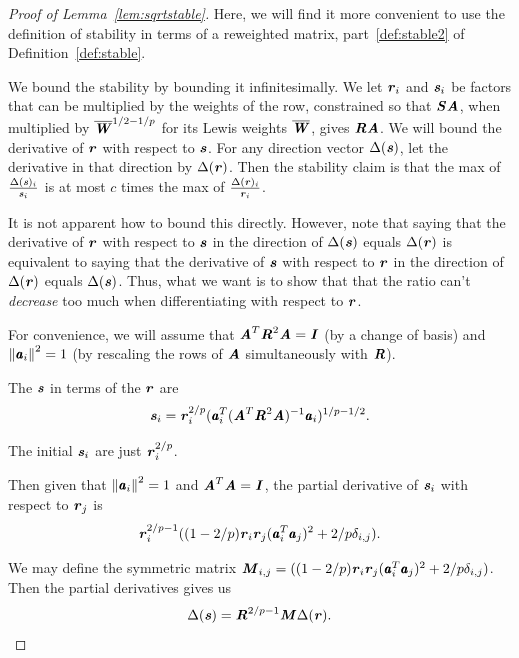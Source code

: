 \begin{proof}[Proof of Lemma~\ref{lem:sqrtstable}]
Here, we will find it more convenient to use the definition of stability in terms of a reweighted matrix,
part~\ref{def:stable2} of Definition~\ref{def:stable}.

We bound the stability by bounding it infinitesimally.  We let $\rr_i$ and $\ss_i$ be factors that can be
multiplied by the weights of the row, constrained so that $\SS \AA$, when multiplied by
$\WWbar^{1/2-1/p}$ for its Lewis weights $\WWbar$, gives $\RR \AA$.  We will bound the derivative
of $\rr$ with respect to $\ss$.  For any direction vector $\Delta(\ss)$, let the derivative
in that direction by $\Delta(\rr)$.  Then the stability claim is that the max of $\frac{\Delta(\ss)_i}{\ss_i}$
is at most $c$ times the max of $\frac{\Delta(\rr)_i}{\rr_i}$.

It is not apparent how to bound this directly.  However, note that saying that the derivative of $\rr$ with
respect to $\ss$ in the direction of $\Delta(\ss)$ equals $\Delta(\rr)$ is equivalent to saying that the derivative of $\ss$ with
respect to $\rr$ in the direction of $\Delta(\rr)$ equals $\Delta(\ss)$.  Thus, what we want is to show that
that the ratio can't \emph{decrease} too much when differentiating with respect to $\rr$.

For convenience, we will assume that $\AA^T \RR^2 \AA = \II$ (by a change of basis)
and $\norm{\aa_i}^2 = 1$ (by rescaling the rows of $\AA$ simultaneously with $\RR$).

The $\ss$ in terms of the $\rr$ are
\begin{equation*}
\ss_i = \rr_i^{2/p} (\aa_i^T (\AA^T \RR^2 \AA)^{-1} \aa_i)^{1/p - 1/2}.
\end{equation*}

The initial $\ss_i$ are just $\rr_i^{2/p}$.

Then given that $\norm{\aa_i}^2 = 1$ and $\AA^T \AA = \II$, the partial derivative of $\ss_i$ with respect to $\rr_j$ is
\begin{equation*}
\rr_i^{2/p-1} ( (1-2/p) \rr_i \rr_j (\aa_i^T \aa_j)^2 + 2/p \delta_{i,j} ).
\end{equation*}

We may define the symmetric matrix $\MM_{i,j} = ( (1-2/p) \rr_i \rr_j (\aa_i^T \aa_j)^2 + 2/p \delta_{i,j} )$.  Then the partial derivatives gives us
\begin{equation*}
\Delta(\ss) = \RR^{2/p-1} \MM \Delta(\rr).
\end{equation*}


\end{proof}
